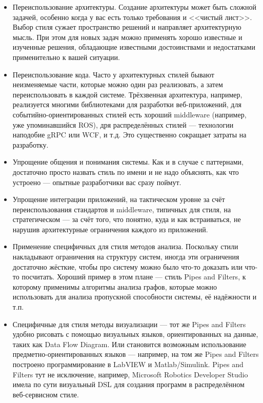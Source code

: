 \documentclass[a5paper]{article}
\begin{document}
\begin{itemize}
    \item Переиспользование архитектуры. Создание архитектуры может быть сложной задачей, особенно когда у вас есть только требования и <<чистый лист>>. Выбор стиля сужает пространство решений и направляет архитектурную мысль. При этом для новых задач можно применять хорошо известные и изученные решения, обладающие известными достоинствами и недостатками применительно к вашей ситуации.
    \item Переиспользование кода. Часто у архитектурных стилей бывают неизменяемые части, которые можно один раз реализовать, а затем переиспользовать в каждой системе. Трёхзвенная архитектура, например, реализуется многими библиотеками для разработки веб-приложений, для событийно-ориентированных стилей есть хороший middleware (например, уже упоминавшийся ROS), дря распределённых стилей --- технологии наподобие gRPC или WCF, и т.д. Это существенно сокращает затраты на разработку.
    \item Упрощение общения и понимания системы. Как и в случае с паттернами, достаточно просто назвать стиль по имени и не надо объяснять, как что устроено --- опытные разработчики вас сразу поймут.
    \item Упрощение интеграции приложений, на тактическом уровне за счёт переиспользования стандартов и middleware, типичных для стиля, на стратегическом --- за счёт того, что понятно, куда и как встраиваться, не нарушив архитектурные ограничения каждого из приложений.
    \item Применение специфичных для стиля методов анализа. Поскольку стили накладывают ограничения на структуру систем, иногда эти ограничения достаточно жёсткие, чтобы про систему можно было что-то доказать или что-то посчитать. Хороший пример в этом плане --- стиль Pipes and Filters, к которому применимы алгоритмы анализа графов, которые можно использовать для анализа пропускной способности системы, её надёжности и т.п.
    \item Специфичные для стиля методы визуализации --- тот же Pipes and Filters удобно рисовать с помощью визуальных языков, ориентированных на данные, таких как Data Flow Diagram. Или становится возможным использование предметно-ориентированных языков --- например, на том же Pipes and Filters построено программирование в LabVIEW и Matlab/Simulink. Pipes and Filters тут не исключение, например, Microsoft Robotics Developer Studio имела по сути визуальный DSL для создания программ в распределённом веб-сервисном стиле.
\end{itemize}
\end{document}

